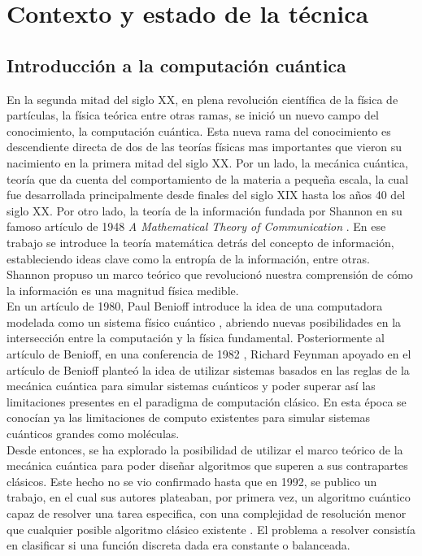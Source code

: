 \chapter{Contexto y estado de la técnica}

\section{Introducción a la computación cuántica}

En la segunda mitad del siglo XX, en plena revolución científica de la física de partículas, la física teórica entre otras ramas, se inició un nuevo campo del conocimiento, la computación cuántica. Esta nueva rama del conocimiento es descendiente directa de dos de las teorías físicas mas importantes que vieron su nacimiento en la primera mitad del siglo XX. Por un lado, la mecánica cuántica, teoría que da cuenta del comportamiento de la materia a pequeña escala, la cual fue desarrollada principalmente desde finales del siglo XIX hasta los años 40 del siglo XX. Por otro lado, la teoría de la información fundada por Shannon en su famoso artículo de 1948 \textit{A Mathematical Theory of Communication} \citep{Shannon1948}. En ese trabajo se introduce la teoría matemática detrás del concepto de información, estableciendo ideas clave como la entropía de la información, entre otras. Shannon propuso un marco teórico que revolucionó nuestra comprensión de cómo la información es una magnitud física medible. \\

En un artículo de 1980, Paul Benioff introduce la idea de una computadora modelada como un sistema físico cuántico \citep{benioff}, abriendo nuevas posibilidades en la intersección entre la computación y la física fundamental. Posteriormente al artículo de Benioff, en una conferencia de 1982 \citep{richard}, Richard Feynman apoyado en el artículo de Benioff planteó la idea de utilizar sistemas basados en las reglas de la mecánica cuántica para simular sistemas cuánticos y poder superar así las limitaciones presentes en el paradigma de computación clásico. En esta época se conocían ya las limitaciones de computo existentes para simular sistemas cuánticos grandes como moléculas. \\

Desde entonces, se ha explorado la posibilidad de utilizar el marco teórico de la mecánica cuántica para poder diseñar algoritmos que superen a sus contrapartes clásicos. Este hecho no se vio confirmado hasta que en 1992, se publico un trabajo, en el cual sus autores plateaban, por primera vez, un algoritmo cuántico capaz de resolver una tarea especifica, con una complejidad de resolución menor que cualquier posible algoritmo clásico existente \citep{deutsch}. El problema a resolver consistía en clasificar si una función discreta dada era constante o balanceada. \\

